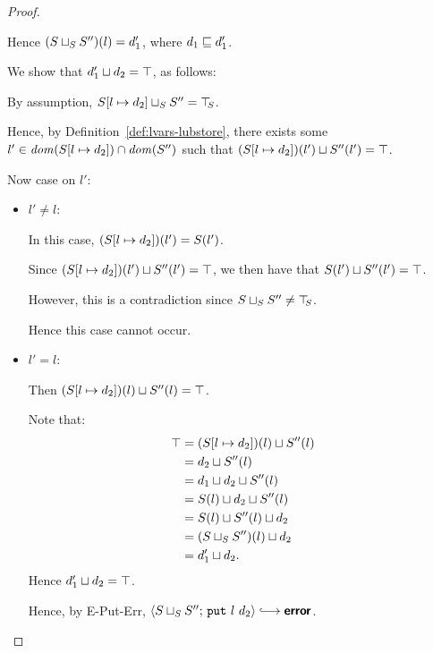 \begin{proof}
\begin{itemize}
\begin{itemize}
          Hence $(S \sqcup_{S} S'')(l) = d'_1$, where $d_1 \sqsubseteq
          d'_1$.

          We show that $d'_1 \sqcup d_2 =
          \top$, as follows:

          By assumption, $S[l \mapsto d_2] \sqcup_{S} S'' = \top\hspace{-0.85mm}_{S}$.

          Hence, by Definition~\ref{def:lvars-lubstore}, there exists
          some $l' \in \mathit{dom}(S[l \mapsto d_2]) \cap \mathit{dom}(S'')$ such
          that $(S[l \mapsto d_2])(l') \sqcup S''(l') = \top$.

          Now case on $l'$:

          \begin{itemize}
            \item $l' \neq l$:

              In this case, $(S[l \mapsto d_2])(l') = S(l')$.

              Since $(S[l \mapsto d_2])(l') \sqcup S''(l') = \top$,
              we then have that $S(l') \sqcup S''(l') = \top$.

              However, this is a contradiction since
              $S \sqcup_{S} S'' \neq \top\hspace{-0.85mm}_{S}$.

              Hence this case cannot occur.

            \item $l' = l$:

              Then $(S[l \mapsto d_2])(l) \sqcup S''(l) = \top$.

              Note that:
              \begin{align*}
                \top &= (S[l \mapsto d_2])(l) \sqcup S''(l) \\ &=
                d_2 \sqcup S''(l) \\ &=
                d_1 \sqcup d_2 \sqcup S''(l)
                \\ &=
                S(l) \sqcup d_2 \sqcup S''(l)
                \\ &=
                S(l) \sqcup S''(l) \sqcup d_2
                \\ &=
                (S \sqcup_{S} S'')(l) \sqcup d_2
                \\ &= d'_1 \sqcup d_2.
              \end{align*}
              Hence $d'_1 \sqcup d_2 = \top$.

              Hence, by {\sc E-Put-Err},
              $\config{\lubstore{S}{S''}}{\putexp{l}{d_2}} \parstepsto
              \error$.


\end{itemize}
\end{itemize}
\end{itemize}
\end{proof}
